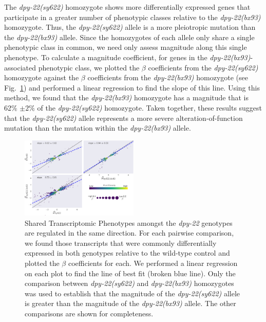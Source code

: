 \documentclass[9pt,twocolumn,twoside]{gsajnl}
\newcommand{\gene}[1]{\mbox{\emph{#1}}}
\newcommand{\dpy}[1]{\gene{dpy-22#1}}
\newcommand{\bx}{\dpy{(bx93)}}
\newcommand{\sy}{\dpy{(sy622)}}
\begin{document}
The \sy{} homozygote shows more differentially expressed genes that participate
in a greater number of phenotypic classes relative to the \bx{} homozygote.
Thus, the \sy{} allele is a more pleiotropic mutation than the \bx{} allele.
Since the homozygotes of each allele only share a single phenotypic class in
common, we need only assess magnitude along this single phenotype. To calculate
a magnitude coefficient, for genes in the \bx{}-associated phenotypic class, we
plotted the $\beta$ coefficients from the \sy{} homozygote against the $\beta$
coefficients from the \bx{} homozygote (see Fig.~\ref{fig:stp}) and performed a
linear regression to find the slope of this line. Using this method, we found
that the \bx{} homozygote has a magnitude that is 62\% $\pm2\%$ of the \sy{}
homozygote. Taken together, these results suggest that the \sy{} allele
represents a more severe alteration-of-function mutation than the mutation
within the \bx{} allele.

\begin{figure}
  \includegraphics[width=0.5\textwidth]{../figs/dpy22-stps.pdf}
  \caption{
           Shared Transcriptomic Phenotypes amongst the \dpy{} genotypes are
           regulated in the same direction. For each pairwise comparison, we
           found those transcripts that were commonly differentially expressed
           in both genotypes relative to the wild-type control and plotted the
           $\beta$ coefficients for each. We performed a linear regression on
           each plot to find the line of best fit (broken blue line). Only the
           comparison between \sy{} and \bx{} homozygotes was used to establish
           that the magnitude of the \sy{} allele is greater than the magnitude
           of the \bx{} allele. The other comparisons are shown for
           completeness.
          }
\label{fig:stp}
\end{figure}
\end{document}
